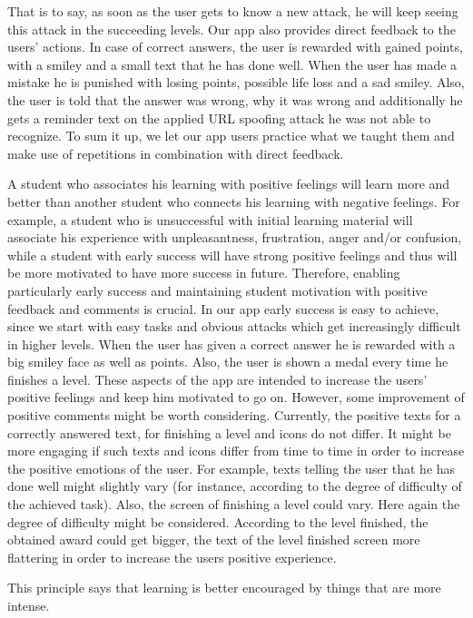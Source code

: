 \begin{description}[leftmargin=0cm]
That is to say, as soon as the user gets to know a new attack, he will keep seeing this attack in the succeeding levels.
Our app also provides direct feedback to the users' actions. 
In case of correct answers, the user is rewarded with gained points, with a smiley and a small text that he has done well.
When the user has made a mistake he is punished with losing points, possible life loss and a sad smiley. Also, the user is told that the answer was wrong, why it was wrong and additionally he gets a reminder text on the applied URL spoofing attack he was not able to recognize.
To sum it up, we let our app users practice what we taught them and make use of repetitions in combination with direct feedback.
	\item[Effect] A student who associates his learning with positive feelings will learn more and better than another student who connects his learning with negative feelings. 
For example, a student who is unsuccessful with initial learning material will associate his experience with unpleasantness, frustration, anger and/or confusion, while a student with early success will have strong positive feelings and thus will be more motivated to have more success in future.
Therefore, enabling particularly early success and maintaining student motivation with positive feedback and comments is crucial.
In our app early success is easy to achieve, since we start with easy tasks and obvious attacks which get increasingly difficult in higher levels.
When the user has given a correct answer he is rewarded with a big smiley face as well as points. 
Also, the user is shown a medal every time he finishes a level.
These aspects of the app are intended to increase the users' positive feelings and keep him motivated to go on. 
However, some improvement of positive comments might be worth considering.
Currently, the positive texts for a correctly answered text, for finishing a level and icons do not differ. 
It might be more engaging if such texts and icons differ from time to time in order to increase the positive emotions of the user. 
For example, texts telling the user that he has done well might slightly vary (for instance, according to the degree of difficulty of the achieved task).
Also, the screen of finishing a level could vary.
Here again the degree of difficulty might be considered. 
According to the level finished, the obtained award could get bigger, the text of the level finished screen more flattering in order to increase the users positive experience.
	\item[Intensity] This principle says that learning is better encouraged by things that are more intense. 

\end{description}
